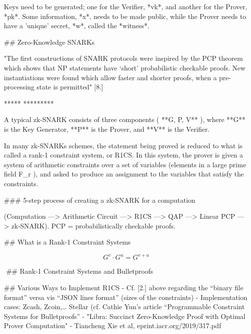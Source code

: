 
 Keys need to be generated; one for the Verifier, *vk*, and another for the Prover, *pk*. Some information, *x*, needs to be made public, while the Prover needs to have a 'unique' secret, *w*, called the *witness*. 
 

  ## Zero-Knowledge SNARKs  
  
  "The first constructions of SNARK protocols were inspired by the PCP theorem which shows that NP statements have ‘short’ probabilistic checkable proofs. New instantiations were found which allow faster and shorter proofs, when a pre-processing state is permitted" [8.]   
 
 
  ***** *********
 
 
 A typical zk-SNARK consists of three components  ( **G, P, V** ),  where  **G**  is the Key Generator,  **P**  is the Prover, and  **V**  is the Verifier. 
 
  
  In many zk-SNARKs schemes, the statement being proved is reduced to what is called a rank-1 constraint system, or R1CS. In this system, the prover is given a system of arithmetic constraints over a set of variables (elements in a large prime field F_r ), and asked to produce an assignment to the variables that satisfy the constraints.  
 
  
  ###  5-step process of creating a zk-SNARK for a computation 
  
  (Computation —> Arithmetic Circuit —> R1CS —> QAP —> Linear PCP —> zk-SNARK). PCP = probabilistically checkable proofs. 

 

  ## What is a Rank-1 Constraint Systems 
  
   
  \begin{equation}
G^v \cdot G^u = G^{v + u}
\end{equation}
  
  ​  
  ## Rank-1 Constraint Systems and Bulletproofs  
  
  
  
  
  ## Various Ways to Implement R1CS 
- Cf. [2.] above regarding the “binary file format” versa vis “JSON lines format” (sizes of the constraints) 
- Implementation cases: Zcash, Zcoin,… Stellar (cf. Cathie Yun’s article “Programmable Constraint Systems for Bulletproofs”
- "Libra: Succinct Zero-Knowledge Proof with Optimal Prover Computation" - Tiancheng Xie et al, eprint.iacr.org/2019/317.pdf  

